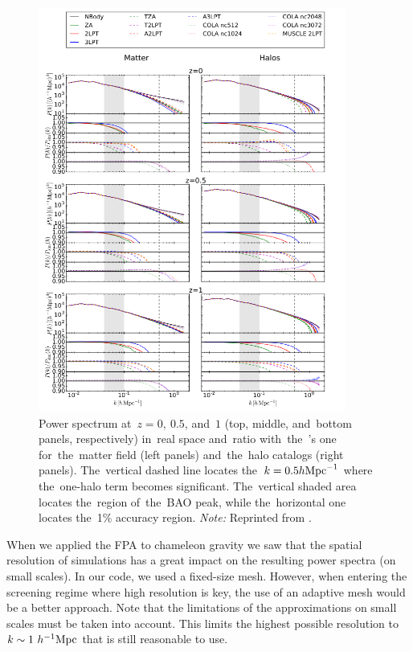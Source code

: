 \begin{figure}[!htb]
  \centering
  \includegraphics[width=0.9\textwidth]{cosmo_evol/app_compare.png}
  \caption{Power spectrum at~$z = 0,\ 0.5$, and~$1$ (top, middle, and~bottom panels, respectively) in~real space and~ratio with~the~\nbody’s one for~the~matter field (left panels) and~the~halo catalogs (right panels). The~vertical dashed line locates the~$k = 0.5h\text{Mpc}^{-1}$ where the~one-halo term becomes significant. The~vertical shaded area locates the~region of~the~BAO peak, while the~horizontal one locates the~1\% accuracy region.  \textit{Note:} Reprinted from \textcite{2017JCAP...07..050M}.}
  \label{fig:app_compare}
\end{figure}
When we applied the FPA to chameleon gravity we saw that the spatial resolution of simulations has a great impact on the resulting power spectra (on small scales). In our code, we used a fixed-size mesh. However, when entering the screening regime where high resolution is key, the use of an adaptive mesh would be a better approach. Note that the limitations of the approximations on small scales must be taken into account. This limits the highest possible resolution to $k\sim1~h^{-1}\text{Mpc}$ that is still reasonable to use.

